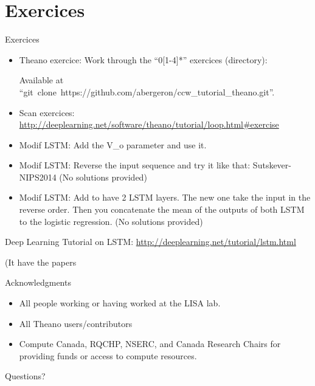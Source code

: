\documentclass[utf8x,xcolor=pdftex,dvipsnames,table]{beamer}
\begin{document}
\section{Exercices}
\begin{frame}{Exercices}
\begin{itemize}
  \item Theano exercice: Work through the ``0[1-4]*'' exercices (directory):

    Available at ``git~clone~https://github.com/abergeron/ccw\_tutorial\_theano.git''.

  \item Scan exercices: \url{http://deeplearning.net/software/theano/tutorial/loop.html\#exercise}

  \item Modif LSTM: Add the V\_o parameter and use it.
  \item Modif LSTM: Reverse the input sequence and try it like that:
        Sutskever-NIPS2014 (No solutions provided)
  \item Modif LSTM: Add to have 2 LSTM layers. The new one take the
    input in the reverse order. Then you concatenate the mean of the
    outputs of both LSTM to the logistic regression. (No solutions provided)
\end{itemize}


Deep Learning Tutorial on LSTM: \url{http://deeplearning.net/tutorial/lstm.html}

(It have the papers
\end{frame}


\begin{frame}{Acknowledgments}
\begin{itemize}
\item All people working or having worked at the LISA lab.
\item All Theano users/contributors
\item Compute Canada, RQCHP, NSERC, and Canada Research Chairs for providing funds or access to compute resources.
\end{itemize}
\end{frame}

\begin{frame}
\begin{center}
\Huge
Questions?
\end{center}
\end{frame}
\end{document}
